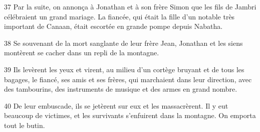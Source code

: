 
37 Par la suite, on annonça à Jonathan et à son frère Simon que les fils de Jambri célébraient un grand mariage. La fiancée, qui était la fille d’un notable très important de Canaan, était escortée en grande pompe depuis Nabatha.

38 Se souvenant de la mort sanglante de leur frère Jean, Jonathan et les siens montèrent se cacher dans un repli de la montagne.

39 Ils levèrent les yeux et virent, au milieu d’un cortège bruyant et de tous les bagages, le fiancé, ses amis et ses frères, qui marchaient dans leur direction, avec des tambourins, des instruments de musique et des armes en grand nombre.

40 De leur embuscade, ils se jetèrent sur eux et les massacrèrent. Il y eut beaucoup de victimes, et les survivants s’enfuirent dans la montagne. On emporta tout le butin.